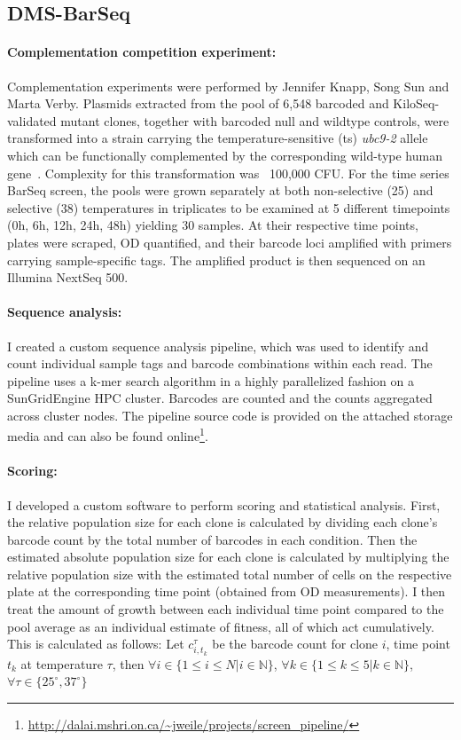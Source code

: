 \subsection{DMS-BarSeq}

\paragraph{Complementation competition experiment:} Complementation experiments were performed by Jennifer Knapp, Song Sun and Marta Verby. 
Plasmids extracted from the pool of 6,548 barcoded and KiloSeq-validated mutant clones, together with barcoded null and wildtype controls, were transformed into a  strain carrying the temperature-sensitive (ts) \textit{ubc9-2} allele which can be functionally complemented by the corresponding wild-type human gene~\cite{jiang_two-hybrid_1996,sun_extended_2016}. Complexity for this transformation was ~100,000 CFU. For the time series BarSeq screen, the pools were grown separately at both non-selective (25\celsius) and selective (38\celsius) temperatures in triplicates to be examined at 5 different timepoints (0h, 6h, 12h, 24h, 48h) yielding 30 samples. At their respective time points, plates were scraped, OD quantified, and their barcode loci amplified with primers carrying sample-specific tags. The amplified product is then sequenced on an Illumina NextSeq 500.

\paragraph{Sequence analysis:} I created a custom sequence analysis pipeline, which was used to identify and count individual sample tags and barcode combinations within each read. The pipeline uses a k-mer search algorithm in a highly parallelized fashion on a SunGridEngine HPC cluster. Barcodes are counted and the counts aggregated across cluster nodes. The pipeline source code is provided on the attached storage media and can also be found online\footnote{\url{http://dalai.mshri.on.ca/~jweile/projects/screen_pipeline/}}.

\paragraph{Scoring:} I developed a custom software to perform scoring and statistical analysis. First, the relative population size for each clone is calculated by dividing each clone's barcode count by the total number of barcodes in each condition. Then the estimated absolute population size for each clone is calculated by multiplying the relative population size with the estimated total number of cells on the respective plate at the corresponding time point (obtained from OD measurements). I then treat the amount of growth between each individual time point compared to the pool average as an individual estimate of fitness, all of which act cumulatively. This is calculated as follows: Let $c_{i,t_k}^\tau$ be the barcode count for clone $i$, time point $t_k$ at temperature $\tau$, then $ \forall i \in \{1 \le i \le N | i \in \mathbb{N} \}$, 
$\forall k \in \{1 \le k \le 5 | k \in \mathbb{N} \}$, 
$\forall \tau \in \{25^{\circ},37^{\circ} \}$

